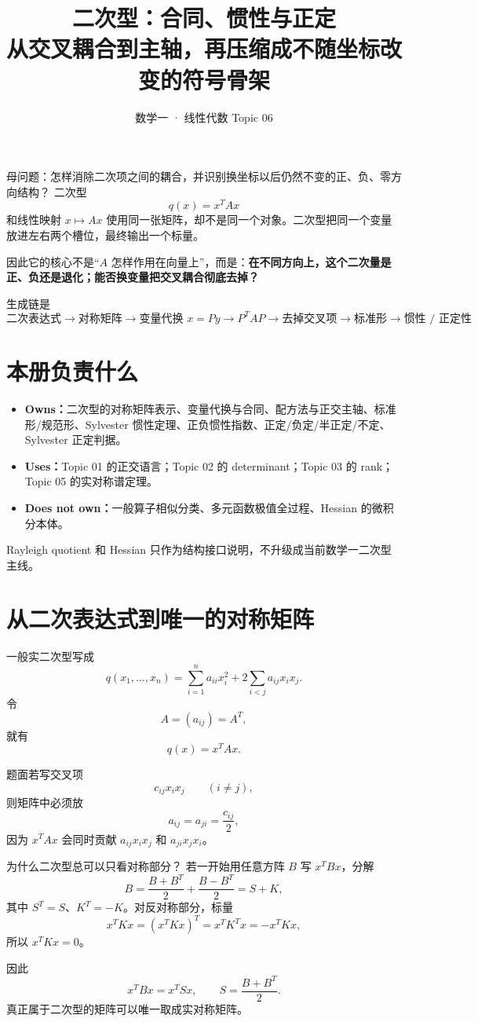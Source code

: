\documentclass[11pt,a4paper]{ctexart}
\title{\vspace{-1.1cm}\textbf{二次型：合同、惯性与正定}\\[0.4em]
\large 从交叉耦合到主轴，再压缩成不随坐标改变的符号骨架}
\author{数学一 · 线性代数 Topic 06}
\date{}
\newcommand{\kw}[1]{\textbf{\color{deep}#1}}
\begin{document}
\maketitle

\begin{corebox}{母问题：怎样消除二次项之间的耦合，并识别换坐标以后仍然不变的正、负、零方向结构？}
二次型
\[
q(x)=x^TAx
\]
和线性映射 $x\mapsto Ax$ 使用同一张矩阵，却不是同一个对象。二次型把同一个变量放进左右两个槽位，最终输出一个标量。

因此它的核心不是“$A$ 怎样作用在向量上”，而是：\kw{在不同方向上，这个二次量是正、负还是退化；能否换变量把交叉耦合彻底去掉？}

生成链是
\[
\boxed{
\text{二次表达式}
\to \text{对称矩阵}
\to \text{变量代换 }x=Py
\to P^TAP
\to \text{去掉交叉项}
\to \text{标准形}
\to \text{惯性 / 正定性}
}
\]
\end{corebox}

\section{本册负责什么}

\begin{itemize}
  \item \kw{Owns：}二次型的对称矩阵表示、变量代换与合同、配方法与正交主轴、标准形/规范形、Sylvester 惯性定理、正负惯性指数、正定/负定/半正定/不定、Sylvester 正定判据。
  \item \kw{Uses：}Topic 01 的正交语言；Topic 02 的 determinant；Topic 03 的 rank；Topic 05 的实对称谱定理。
  \item \kw{Does not own：}一般算子相似分类、多元函数极值全过程、Hessian 的微积分本体。
\end{itemize}

Rayleigh quotient 和 Hessian 只作为结构接口说明，不升级成当前数学一二次型主线。

\section{从二次表达式到唯一的对称矩阵}

一般实二次型写成
\[
q(x_1,\dots,x_n)
=\sum_{i=1}^{n}a_{ii}x_i^2
+2\sum_{i<j}a_{ij}x_ix_j.
\]
令
\[
A=(a_{ij})=A^T,
\]
就有
\[
\boxed{q(x)=x^TAx.}
\]

题面若写交叉项
\[
c_{ij}x_ix_j\qquad(i\neq j),
\]
则矩阵中必须放
\[
\boxed{a_{ij}=a_{ji}=\frac{c_{ij}}2,}
\]
因为 $x^TAx$ 会同时贡献 $a_{ij}x_ix_j$ 和 $a_{ji}x_jx_i$。

\begin{warnbox}{为什么二次型总可以只看对称部分？}
若一开始用任意方阵 $B$ 写 $x^TBx$，分解
\[
B=\frac{B+B^T}{2}+\frac{B-B^T}{2}=S+K,
\]
其中 $S^T=S$、$K^T=-K$。对反对称部分，标量
\[
x^TKx=(x^TKx)^T=x^TK^Tx=-x^TKx,
\]
所以 $x^TKx=0$。

因此
\[
\boxed{x^TBx=x^TSx,\qquad S=\frac{B+B^T}{2}.}
\]
真正属于二次型的矩阵可以唯一取成实对称矩阵。
\end{warnbox}
\end{document}
